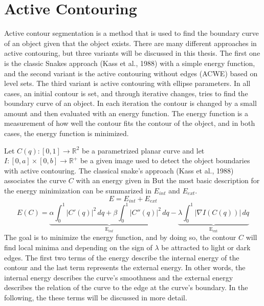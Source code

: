 \section{Active Contouring }
Active contour segmentation \cite{vondracek_image_2018} is a method that is used to find the boundary curve of an object given that the object exists. There are many different approaches in active contouring, but three variants will be discussed in this thesis. The first one is the classic Snakes approach (Kass et al., 1988) \cite{kass_snakes_1988} with a simple energy function, and the second variant is the active contouring without edges (ACWE)  based on level sets. The third variant is active contouring with ellipse parameters. In all cases, an initial contour is set, and through iterative changes, tries to find the boundary curve of an object. In each iteration the contour is changed by a small amount and then evaluated with an energy function. The energy function is a measurement of how well the contour fits the contour of the object, and in both cases, the energy function is minimized.

Let $C(q): [0, 1] \rightarrow \mathbb{R}^2$ be a parametrized planar curve and let $I : [0, a] \times [0, b] \rightarrow \mathbb{R}^+$ be a given image used to detect the object boundaries with active contouring. The classical snake's approach (Kass et al., 1988) \cite{kass_snakes_1988} associates the curve $C$ with an energy given in 
But the most basic description for the energy minimization can be summarized in $E_{int}$ and $E_{ext}$. 
\begin{equation}
    E = E_{int} + E_{ext}
    \label{energy}
\end{equation}
\begin{equation}
        E(C) = \underbrace{\alpha \int_0^1 |C'(q)|^2 \, dq + \beta \int_0^1 |C''(q)|^2 \, dq}_{\text{E}_{int}} - \underbrace{\lambda \int_0^1 |\nabla I (C(q))| \, dq}_{\text{E}_{\text{ext}}}
\label{acgd}
\end{equation}
The goal is to minimize the energy function, and by doing so, the contour $C$ will find local minima and depending on the sign of $\lambda$ be attracted to light or dark edges. The first two terms of the energy describe the internal energy of the contour and the last term represents the external energy. In other words, the internal energy describes the curve's smoothness and the external energy describes the relation of the curve to the edge at the curve's boundary. In the following, the these terms will be discussed in more detail.

